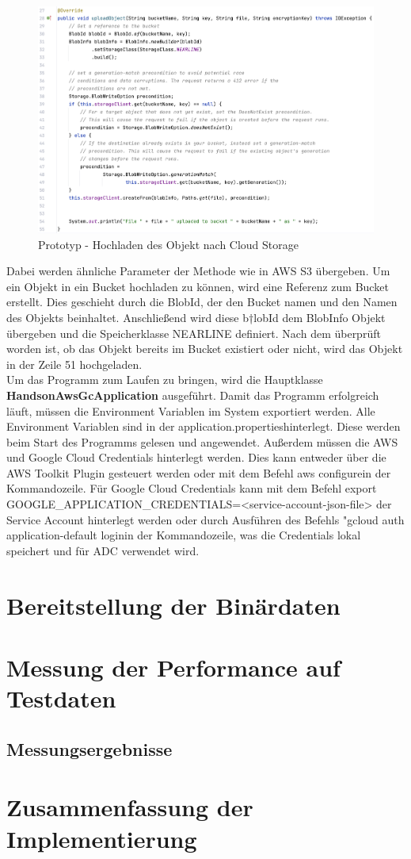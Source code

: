 \begin{figure}[h]
	\centering
	\includegraphics[width=15cm,keepaspectratio]{Pictures/UploadObjectGC.png}
	\caption{Prototyp - Hochladen des Objekt nach Cloud Storage}
\end{figure}

Dabei werden ähnliche Parameter der Methode wie in AWS S3 übergeben. Um ein Objekt in ein Bucket hochladen zu können, wird eine Referenz zum Bucket erstellt. Dies geschieht durch die BlobId, der den Bucket namen und den Namen des Objekts beinhaltet. Anschließend wird diese b†lobId dem BlobInfo Objekt übergeben und die Speicherklasse NEARLINE definiert. Nach dem überprüft worden ist, ob das Objekt bereits im Bucket existiert oder nicht, wird das Objekt in der Zeile 51 hochgeladen.\\

Um das Programm zum Laufen zu bringen, wird die Hauptklasse \textbf{HandsonAwsGcApplication} ausgeführt. Damit das Programm erfolgreich läuft, müssen die Environment Variablen im System exportiert werden. Alle Environment Variablen sind in der \glqq application.properties\grqq hinterlegt. Diese werden beim Start des Programms gelesen und angewendet. Außerdem müssen die AWS  und Google Cloud Credentials hinterlegt werden. Dies kann entweder über die AWS Toolkit Plugin gesteuert werden oder mit dem Befehl \glqq aws configure\grqq in der Kommandozeile. Für Google Cloud Credentials kann mit dem Befehl \glqq export GOOGLE\_APPLICATION\_CREDENTIALS=<service-account-json-file> der Service Account hinterlegt werden oder durch Ausführen des Befehls "gcloud auth application-default login\grqq in der Kommandozeile, was die Credentials lokal speichert und für ADC verwendet wird.


\section{Bereitstellung der Binärdaten}

\section{Messung der Performance auf Testdaten}

\subsection{Messungsergebnisse}

\section{Zusammenfassung der Implementierung}